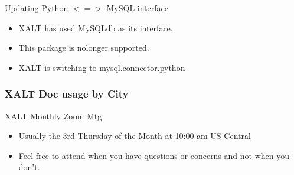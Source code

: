 \documentclass{beamer}
\begin{document}
\begin{frame}{Updating Python $<=>$ MySQL interface}
  \begin{itemize}
    \item XALT has used MySQLdb as its interface.
    \item This package is nolonger supported.
    \item XALT is switching to mysql.connector.python 
  \end{itemize}
\end{frame}



\begin{frame}[fragile]
    \frametitle{XALT Doc usage by City}
\end{frame}

\begin{frame}{XALT Monthly Zoom Mtg}
  \begin{itemize}
    \item Usually the 3rd Thursday of the Month at 10:00 am US Central
    \item Feel free to attend when you have questions or concerns and
      not when you don't.
  \end{itemize}
\end{frame}
\end{document}

